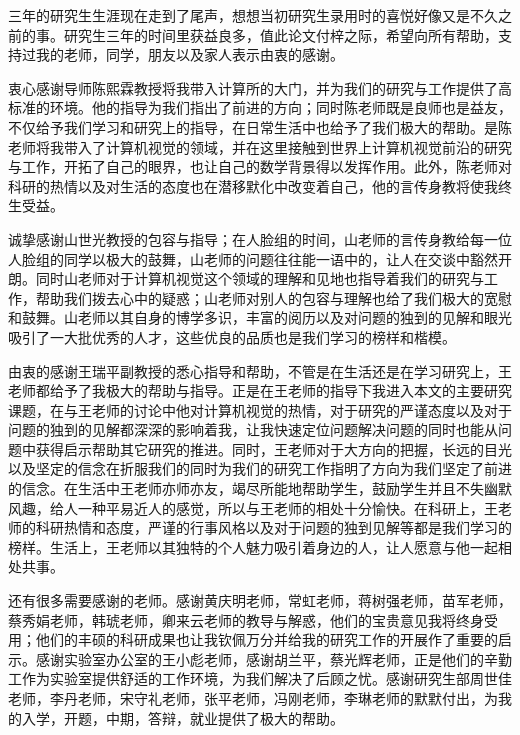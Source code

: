 
\begin{ack}
三年的研究生生涯现在走到了尾声，想想当初研究生录用时的喜悦好像又是不久之前的事。研究生三年的时间里获益良多，值此论文付梓之际，希望向所有帮助，支持过我的老师，同学，朋友以及家人表示由衷的感谢。

衷心感谢导师陈熙霖教授将我带入计算所的大门，并为我们的研究与工作提供了高标准的环境。他的指导为我们指出了前进的方向；同时陈老师既是良师也是益友，不仅给予我们学习和研究上的指导，在日常生活中也给予了我们极大的帮助。是陈老师将我带入了计算机视觉的领域，并在这里接触到世界上计算机视觉前沿的研究与工作，开拓了自己的眼界，也让自己的数学背景得以发挥作用。此外，陈老师对科研的热情以及对生活的态度也在潜移默化中改变着自己，他的言传身教将使我终生受益。

诚挚感谢山世光教授的包容与指导；在人脸组的时间，山老师的言传身教给每一位人脸组的同学以极大的鼓舞，山老师的问题往往能一语中的，让人在交谈中豁然开朗。同时山老师对于计算机视觉这个领域的理解和见地也指导着我们的研究与工作，帮助我们拨去心中的疑惑；山老师对别人的包容与理解也给了我们极大的宽慰和鼓舞。山老师以其自身的博学多识，丰富的阅历以及对问题的独到的见解和眼光吸引了一大批优秀的人才，这些优良的品质也是我们学习的榜样和楷模。

由衷的感谢王瑞平副教授的悉心指导和帮助，不管是在生活还是在学习研究上，王老师都给予了我极大的帮助与指导。正是在王老师的指导下我进入本文的主要研究课题，在与王老师的讨论中他对计算机视觉的热情，对于研究的严谨态度以及对于问题的独到的见解都深深的影响着我，让我快速定位问题解决问题的同时也能从问题中获得启示帮助其它研究的推进。同时，王老师对于大方向的把握，长远的目光以及坚定的信念在折服我们的同时为我们的研究工作指明了方向为我们坚定了前进的信念。在生活中王老师亦师亦友，竭尽所能地帮助学生，鼓励学生并且不失幽默风趣，给人一种平易近人的感觉，所以与王老师的相处十分愉快。在科研上，王老师的科研热情和态度，严谨的行事风格以及对于问题的独到见解等都是我们学习的榜样。生活上，王老师以其独特的个人魅力吸引着身边的人，让人愿意与他一起相处共事。

还有很多需要感谢的老师。感谢黄庆明老师，常虹老师，蒋树强老师，苗军老师，蔡秀娟老师，韩琥老师，卿来云老师的教导与解惑，他们的宝贵意见我将终身受用；他们的丰硕的科研成果也让我钦佩万分并给我的研究工作的开展作了重要的启示。感谢实验室办公室的王小彪老师，感谢胡兰平，蔡光辉老师，正是他们的辛勤工作为实验室提供舒适的工作环境，为我们解决了后顾之忧。感谢研究生部周世佳老师，李丹老师，宋守礼老师，张平老师，冯刚老师，李琳老师的默默付出，为我的入学，开题，中期，答辩，就业提供了极大的帮助。


\end{ack}
